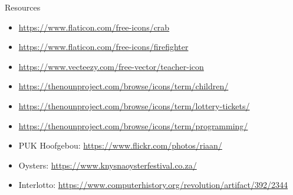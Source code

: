 \begin{frame}{Resources}
	\begin{itemize}
		\item \url{https://www.flaticon.com/free-icons/crab}
		\item \url{https://www.flaticon.com/free-icons/firefighter}
		\item \url{https://www.vecteezy.com/free-vector/teacher-icon}
		\item \url{https://thenounproject.com/browse/icons/term/children/}
		\item \url{https://thenounproject.com/browse/icons/term/lottery-tickets/}
		\item \url{https://thenounproject.com/browse/icons/term/programming/}
		\item PUK Hoofgebou: \url{https://www.flickr.com/photos/riaan/}
		\item Oysters: \url{https://www.knysnaoysterfestival.co.za/}
		\item Interlotto: \url{https://www.computerhistory.org/revolution/artifact/392/2344}
	\end{itemize}
	\note{}
\end{frame}
